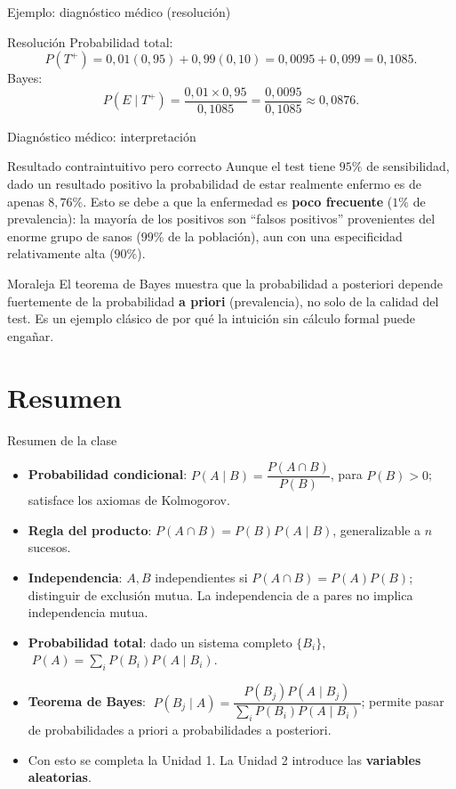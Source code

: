 \documentclass[aspectratio=169,11pt]{beamer}
\begin{document}
\begin{frame}{Ejemplo: diagnóstico médico (resolución)}
\begin{block}{Resolución}
Probabilidad total:
\[
P(T^+) = 0{,}01(0{,}95) + 0{,}99(0{,}10) = 0{,}0095+0{,}099 = 0{,}1085.
\]
Bayes:
\[
P(E\mid T^+) = \frac{0{,}01 \times 0{,}95}{0{,}1085} = \frac{0{,}0095}{0{,}1085} \approx 0{,}0876.
\]
\end{block}
\end{frame}

\begin{frame}{Diagnóstico médico: interpretación}
\begin{alertblock}{Resultado contraintuitivo pero correcto}
Aunque el test tiene $95\%$ de sensibilidad, dado un resultado positivo la probabilidad de estar realmente enfermo es de apenas $8{,}76\%$. Esto se debe a que la enfermedad es \textbf{poco frecuente} ($1\%$ de prevalencia): la mayoría de los positivos son ``falsos positivos'' provenientes del enorme grupo de sanos ($99\%$ de la población), aun con una especificidad relativamente alta ($90\%$).
\end{alertblock}
\begin{block}{Moraleja}
El teorema de Bayes muestra que la probabilidad a posteriori depende fuertemente de la probabilidad \textbf{a priori} (prevalencia), no solo de la calidad del test. Es un ejemplo clásico de por qué la intuición sin cálculo formal puede engañar.
\end{block}
\end{frame}

\section{Resumen}

\begin{frame}{Resumen de la clase}
\begin{itemize}
\item \textbf{Probabilidad condicional}: $P(A\mid B) = \dfrac{P(A\cap B)}{P(B)}$, para $P(B)>0$; satisface los axiomas de Kolmogorov.
\item \textbf{Regla del producto}: $P(A\cap B) = P(B)P(A\mid B)$, generalizable a $n$ sucesos.
\item \textbf{Independencia}: $A,B$ independientes si $P(A\cap B)=P(A)P(B)$; distinguir de exclusión mutua. La independencia de a pares no implica independencia mutua.
\item \textbf{Probabilidad total}: dado un sistema completo $\{B_i\}$, $\; P(A) = \sum_i P(B_i)P(A\mid B_i)$.
\item \textbf{Teorema de Bayes}: $\; P(B_j\mid A) = \dfrac{P(B_j)P(A\mid B_j)}{\sum_i P(B_i)P(A\mid B_i)}$; permite pasar de probabilidades a priori a probabilidades a posteriori.
\item Con esto se completa la Unidad 1. La Unidad 2 introduce las \textbf{variables aleatorias}.
\end{itemize}
\end{frame}
\end{document}
